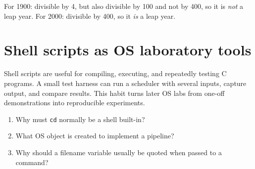\begin{workedexample}
For 1900: divisible by 4, but also divisible by 100 and not by 400, so it is \emph{not} a leap year. For 2000: divisible by 400, so it \emph{is} a leap year.
\end{workedexample}

\section{Shell scripts as OS laboratory tools}
Shell scripts are useful for compiling, executing, and repeatedly testing C programs. A small test harness can run a scheduler with several inputs, capture output, and compare results. This habit turns later OS labs from one-off demonstrations into reproducible experiments.

\begin{quickcheck}
\begin{enumerate}
  \item Why must \texttt{cd} normally be a shell built-in?
  \item What OS object is created to implement a pipeline?
  \item Why should a filename variable usually be quoted when passed to a command?
\end{enumerate}
\end{quickcheck}
